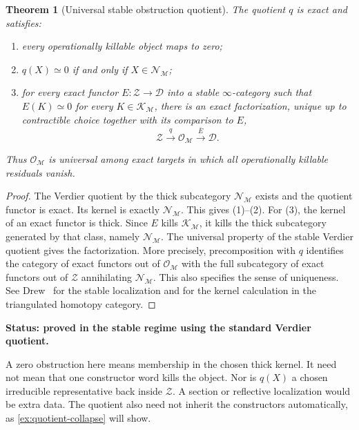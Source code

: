 \documentclass[11pt]{article}
\newtheorem{theorem}{Theorem}[section]
\theoremstyle{definition}
\theoremstyle{remark}
\newcommand{\status}[1]{\textbf{Status: #1.}}
\begin{document}
\begin{theorem}[Universal stable obstruction quotient]\label{thm:obstruction-quotient}
The quotient $q$ is exact and satisfies:
\begin{enumerate}
    \item every operationally killable object maps to zero;
    \item $q(X)\simeq0$ if and only if $X\in\mathcal N_{\mathscr M}$;
    \item for every exact functor $E:\mathcal Z\to\mathcal D$ into a stable $\infty$-category such that $E(K)\simeq0$ for every $K\in\mathcal K_{\mathscr M}$, there is an exact factorization, unique up to contractible choice together with its comparison to $E$,
    \[
    \mathcal Z\xrightarrow{q}\mathcal O_{\mathscr M}\xrightarrow{\bar E}\mathcal D.
    \]
\end{enumerate}
Thus $\mathcal O_{\mathscr M}$ is universal among exact targets in which all operationally killable residuals vanish.
\end{theorem}

\begin{proof}
The Verdier quotient by the thick subcategory $\mathcal N_{\mathscr M}$ exists and the quotient functor is exact. Its kernel is exactly $\mathcal N_{\mathscr M}$. This gives (1)--(2). For (3), the kernel of an exact functor is thick. Since $E$ kills $\mathcal K_{\mathscr M}$, it kills the thick subcategory generated by that class, namely $\mathcal N_{\mathscr M}$. The universal property of the stable Verdier quotient gives the factorization. More precisely, precomposition with $q$ identifies the category of exact functors out of $\mathcal O_{\mathscr M}$ with the full subcategory of exact functors out of $\mathcal Z$ annihilating $\mathcal N_{\mathscr M}$. This also specifies the sense of uniqueness. See Drew~\cite{Drew2015} for the stable localization and \cite{StacksVerdier} for the kernel calculation in the triangulated homotopy category.
\end{proof}

\status{proved in the stable regime using the standard Verdier quotient}

A zero obstruction here means membership in the chosen thick kernel. It need not mean that one constructor word kills the object. Nor is $q(X)$ a chosen irreducible representative back inside $\mathcal Z$. A section or reflective localization would be extra data. The quotient also need not inherit the constructors automatically, as \cref{ex:quotient-collapse} will show.
\end{document}
